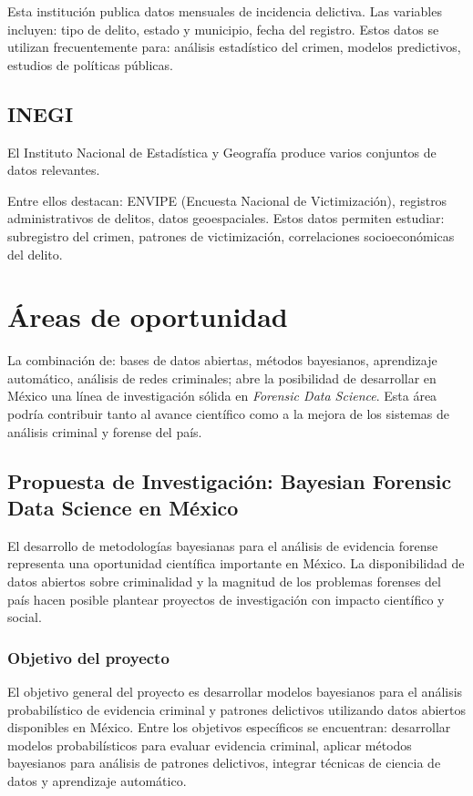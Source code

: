 \documentclass[a4paper,10pt,oneside]{article}
\begin{document}
Esta instituci\'on publica datos mensuales de incidencia delictiva. Las variables incluyen: tipo de delito, estado y municipio, fecha del registro. Estos datos se utilizan frecuentemente para: an\'alisis estad\'istico del crimen, modelos predictivos, estudios de pol\'iticas p\'ublicas.

\subsection{INEGI}

El Instituto Nacional de Estad\'istica y Geograf\'ia produce varios conjuntos de datos relevantes.

Entre ellos destacan: ENVIPE (Encuesta Nacional de Victimizaci\'on), registros administrativos de delitos, datos geoespaciales. Estos datos permiten estudiar: subregistro del crimen, patrones de victimizaci\'on, correlaciones socioecon\'omicas del delito.

\section{\'Areas de oportunidad}

La combinaci\'on de: bases de datos abiertas, m\'etodos bayesianos, aprendizaje autom\'atico, an\'alisis de redes criminales; abre la posibilidad de desarrollar en M\'exico una l\'inea de investigaci\'on s\'olida en \textit{Forensic Data Science}. Esta \'area podr\'ia contribuir tanto al avance cient\'ifico como a la mejora de los sistemas de an\'alisis criminal y forense del pa\'is.

\subsection{Propuesta de Investigaci\'on: Bayesian Forensic Data Science en M\'exico}

El desarrollo de metodolog\'ias bayesianas para el an\'alisis de evidencia forense representa una oportunidad cient\'ifica importante en M\'exico. La disponibilidad de datos abiertos sobre criminalidad y la magnitud de los problemas forenses del pa\'is hacen posible plantear proyectos de investigaci\'on con impacto cient\'ifico y social.

\subsubsection*{Objetivo del proyecto}

El objetivo general del proyecto es desarrollar modelos bayesianos para el an\'alisis probabil\'istico de evidencia criminal y patrones delictivos utilizando datos abiertos disponibles en M\'exico. Entre los objetivos espec\'ificos se encuentran: desarrollar modelos probabil\'isticos para evaluar evidencia criminal, aplicar m\'etodos bayesianos para an\'alisis de patrones delictivos, integrar t\'ecnicas de ciencia de datos y aprendizaje autom\'atico.
\end{document}

